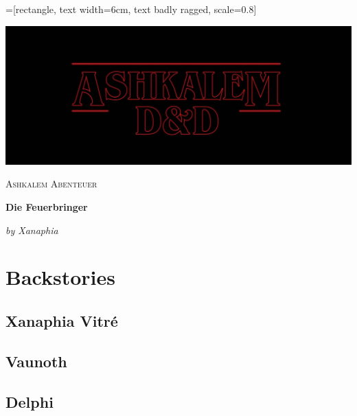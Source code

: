 \documentclass[10pt,twoside,twocolumn,openany]{book}
\begin{document}
	=[rectangle, text width=6cm, text badly ragged, scale=0.8]
	\begin{titlepage} %
		
		\centering
		\includegraphics[width=1\textwidth]{AshkalemLogo}\par\vspace{1cm}
		{\scshape\LARGE Ashkalem Abenteuer \par}
		\vspace{1cm}
		{\huge\bfseries Die Feuerbringer \par}
		\vspace{2cm}
		{\Large\itshape by Xanaphia \par}
		
		\vfill
		
		
	\end{titlepage}
	
	\tableofcontents %
	\newpage %
	
	\chapter{Backstories}
	
	\section{Xanaphia Vitré}
	
	\section{Vaunoth}
	
	\section{Delphi}
	
\end{document}
